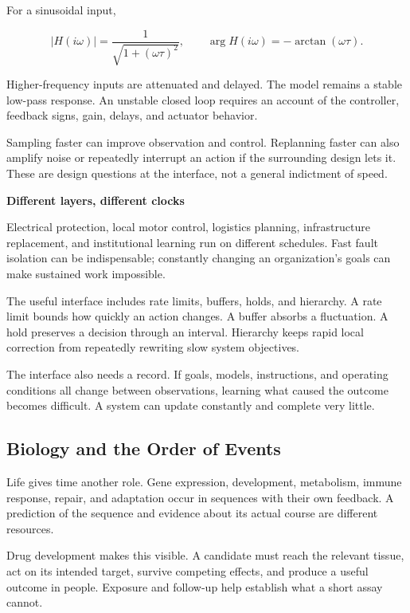 \documentclass[11pt,openany]{book}
\newcommand{\subhead}[1]{\par\medskip\noindent\textbf{#1}\par\nobreak\smallskip}
\begin{document}
For a sinusoidal input,

\begin{equation}
|H(i\omega)|=\frac{1}{\sqrt{1+(\omega\tau)^2}},
\qquad
\arg H(i\omega)=-\arctan(\omega\tau).
\end{equation}

Higher-frequency inputs are attenuated and delayed. The model remains a stable low-pass response. An unstable closed loop requires an account of the controller, feedback signs, gain, delays, and actuator behavior.

Sampling faster can improve observation and control. Replanning faster can also amplify noise or repeatedly interrupt an action if the surrounding design lets it. These are design questions at the interface, not a general indictment of speed.

\subhead{Different layers, different clocks}

Electrical protection, local motor control, logistics planning, infrastructure replacement, and institutional learning run on different schedules. Fast fault isolation can be indispensable; constantly changing an organization's goals can make sustained work impossible.

The useful interface includes rate limits, buffers, holds, and hierarchy. A rate limit bounds how quickly an action changes. A buffer absorbs a fluctuation. A hold preserves a decision through an interval. Hierarchy keeps rapid local correction from repeatedly rewriting slow system objectives.

The interface also needs a record. If goals, models, instructions, and operating conditions all change between observations, learning what caused the outcome becomes difficult. A system can update constantly and complete very little.

\subsection{Biology and the Order of Events}

Life gives time another role. Gene expression, development, metabolism, immune response, repair, and adaptation occur in sequences with their own feedback. A prediction of the sequence and evidence about its actual course are different resources.

Drug development makes this visible. A candidate must reach the relevant tissue, act on its intended target, survive competing effects, and produce a useful outcome in people. Exposure and follow-up help establish what a short assay cannot.
\end{document}
